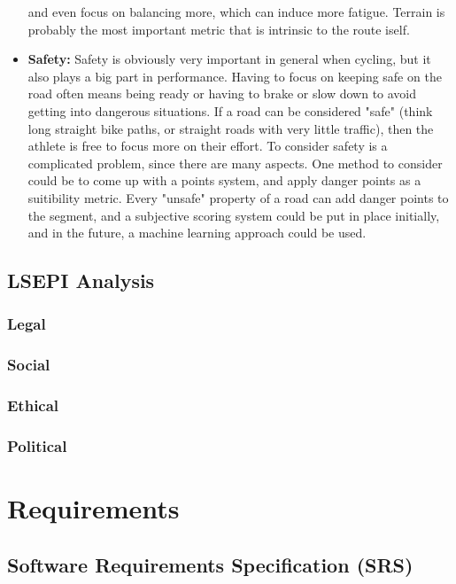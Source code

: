 \documentclass[11pt,a4paper]{report}
\begin{document}
\begin{itemize}
	      and even focus on balancing more, which can induce more fatigue. Terrain is probably the most important metric that is intrinsic to the route iself.
	\item \textbf{Safety:} Safety is obviously very important in general when cycling, but it also plays a big part in performance. Having to focus on keeping safe on the road often means
	      being ready or having to brake or slow down to avoid getting into dangerous situations. If a road can be considered "safe" (think long straight bike paths, or straight roads with very little traffic), then
	      the athlete is free to focus more on their effort. To consider safety is a complicated problem, since there are many aspects. One method to consider could be to come up with a points system, and apply danger points
	      as a suitibility metric. Every "unsafe" property of a road can add danger points to the segment, and a subjective scoring system could be put in place initially, and in the future, a machine learning approach could be used.
\end{itemize}


\section{LSEPI Analysis}
\subsection{Legal}
\subsection{Social}
\subsection{Ethical}
\subsection{Political}
\label{sec:lsepi}

\chapter{Requirements}
\label{chap:requirements}
\section{Software Requirements Specification (SRS)}
\label{sec:srs}
\end{document}
